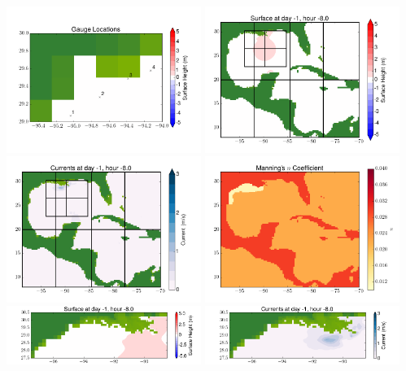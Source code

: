 \documentclass[11pt]{article}
\begin{document}
\includegraphics[width=0.475\textwidth]{frame0039fig10.png}
\vskip 10pt 
\includegraphics[width=0.475\textwidth]{frame0040fig1.png}
\includegraphics[width=0.475\textwidth]{frame0040fig2.png}
\vskip 10pt 
\includegraphics[width=0.475\textwidth]{frame0040fig3.png}
\includegraphics[width=0.475\textwidth]{frame0040fig4.png}
\vskip 10pt 
\includegraphics[width=0.475\textwidth]{frame0040fig5.png}
\end{document}
